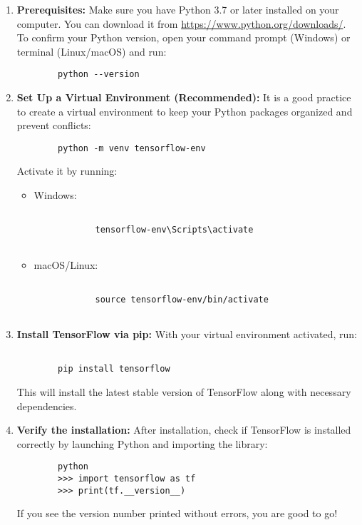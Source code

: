 \begin{enumerate}
	\item \textbf{Prerequisites:}  
	Make sure you have Python 3.7 or later installed on your computer. You can download it from \url{https://www.python.org/downloads/}.  
	To confirm your Python version, open your command prompt (Windows) or terminal (Linux/macOS) and run:
	\begin{verbatim}
		python --version
	\end{verbatim}
	
	\item \textbf{Set Up a Virtual Environment (Recommended):}  
	It is a good practice to create a virtual environment to keep your Python packages organized and prevent conflicts:
	\begin{verbatim}
		python -m venv tensorflow-env
	\end{verbatim}
	Activate it by running:
	
	\begin{itemize}
		\item Windows:
		\begin{framed}
		\begin{verbatim}
			
			tensorflow-env\Scripts\activate
			
		\end{verbatim}
	\end{framed}
		\item macOS/Linux:
		\begin{framed}
		\begin{verbatim}
			
			source tensorflow-env/bin/activate
		
		\end{verbatim}
	\end{framed}
	\end{itemize}
	
	\item \textbf{Install TensorFlow via pip:}  
	With your virtual environment activated, run:
	\begin{framed}
	\begin{verbatim}
		
		pip install tensorflow

	\end{verbatim}
		\end{framed}
	This will install the latest stable version of TensorFlow along with necessary dependencies.
	
	\item \textbf{Verify the installation:}  
	After installation, check if TensorFlow is installed correctly by launching Python and importing the library:
	\begin{framed}
	\begin{verbatim}
		python
		>>> import tensorflow as tf
		>>> print(tf.__version__)
	\end{verbatim}
		\end{framed}
	If you see the version number printed without errors, you are good to go!
	

\end{enumerate}
